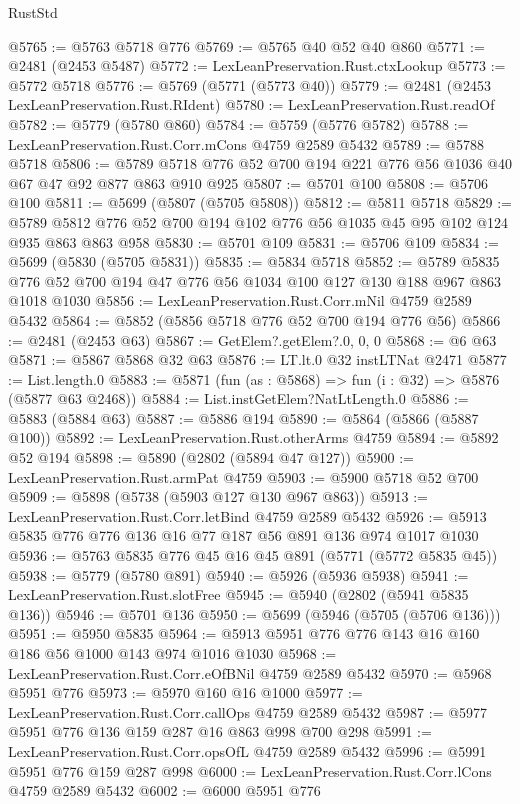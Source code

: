 \begin{lexlean}{RustStd}
\begin{coremodule}
@5765 := @5763 @5718 @776
@5769 := @5765 @40 @52 @40 @860
@5771 := @2481 (@2453 @5487)
@5772 := LexLeanPreservation.Rust.ctxLookup
@5773 := @5772 @5718
@5776 := @5769 (@5771 (@5773 @40))
@5779 := @2481 (@2453 LexLeanPreservation.Rust.RIdent)
@5780 := LexLeanPreservation.Rust.readOf
@5782 := @5779 (@5780 @860)
@5784 := @5759 (@5776 @5782)
@5788 := LexLeanPreservation.Rust.Corr.mCons @4759 @2589 @5432
@5789 := @5788 @5718
@5806 := @5789 @5718 @776 @52 @700 @194 @221 @776 @56 @1036 @40 @67 @47 @92 @877 @863 @910 @925
@5807 := @5701 @100
@5808 := @5706 @100
@5811 := @5699 (@5807 (@5705 @5808))
@5812 := @5811 @5718
@5829 := @5789 @5812 @776 @52 @700 @194 @102 @776 @56 @1035 @45 @95 @102 @124 @935 @863 @863 @958
@5830 := @5701 @109
@5831 := @5706 @109
@5834 := @5699 (@5830 (@5705 @5831))
@5835 := @5834 @5718
@5852 := @5789 @5835 @776 @52 @700 @194 @47 @776 @56 @1034 @100 @127 @130 @188 @967 @863 @1018 @1030
@5856 := LexLeanPreservation.Rust.Corr.mNil @4759 @2589 @5432
@5864 := @5852 (@5856 @5718 @776 @52 @700 @194 @776 @56)
@5866 := @2481 (@2453 @63)
@5867 := GetElem?.getElem?.{0, 0, 0}
@5868 := @6 @63
@5871 := @5867 @5868 @32 @63
@5876 := LT.lt.{0} @32 instLTNat @2471
@5877 := List.length.{0}
@5883 := @5871 (fun (as : @5868) => fun (i : @32) => @5876 (@5877 @63 @2468))
@5884 := List.instGetElem?NatLtLength.{0}
@5886 := @5883 (@5884 @63)
@5887 := @5886 @194
@5890 := @5864 (@5866 (@5887 @100))
@5892 := LexLeanPreservation.Rust.otherArms @4759
@5894 := @5892 @52 @194
@5898 := @5890 (@2802 (@5894 @47 @127))
@5900 := LexLeanPreservation.Rust.armPat @4759
@5903 := @5900 @5718 @52 @700
@5909 := @5898 (@5738 (@5903 @127 @130 @967 @863))
@5913 := LexLeanPreservation.Rust.Corr.letBind @4759 @2589 @5432
@5926 := @5913 @5835 @776 @776 @136 @16 @77 @187 @56 @891 @136 @974 @1017 @1030
@5936 := @5763 @5835 @776 @45 @16 @45 @891 (@5771 (@5772 @5835 @45))
@5938 := @5779 (@5780 @891)
@5940 := @5926 (@5936 @5938)
@5941 := LexLeanPreservation.Rust.slotFree
@5945 := @5940 (@2802 (@5941 @5835 @136))
@5946 := @5701 @136
@5950 := @5699 (@5946 (@5705 (@5706 @136)))
@5951 := @5950 @5835
@5964 := @5913 @5951 @776 @776 @143 @16 @160 @186 @56 @1000 @143 @974 @1016 @1030
@5968 := LexLeanPreservation.Rust.Corr.eOfBNil @4759 @2589 @5432
@5970 := @5968 @5951 @776
@5973 := @5970 @160 @16 @1000
@5977 := LexLeanPreservation.Rust.Corr.callOps @4759 @2589 @5432
@5987 := @5977 @5951 @776 @136 @159 @287 @16 @863 @998 @700 @298
@5991 := LexLeanPreservation.Rust.Corr.opsOfL @4759 @2589 @5432
@5996 := @5991 @5951 @776 @159 @287 @998
@6000 := LexLeanPreservation.Rust.Corr.lCons @4759 @2589 @5432
@6002 := @6000 @5951 @776

\end{coremodule}
\end{lexlean}
